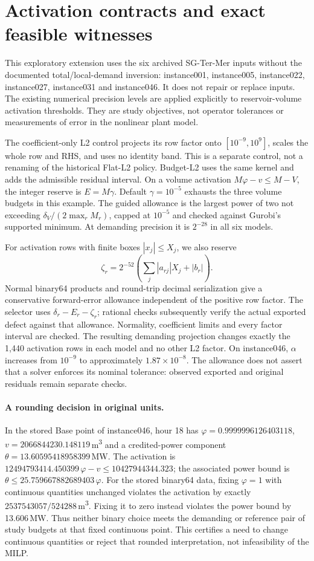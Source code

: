 \documentclass[11pt]{article}
\begin{document}
\section{Activation contracts and exact feasible witnesses}
\label{sec:activation-followup}
This exploratory extension uses the six archived SG-Ter-Mer inputs without the
documented total/local-demand inversion: instance001, instance005, instance022,
instance027, instance031 and instance046. It does not repair or replace inputs.
The existing numerical precision levels are applied explicitly to reservoir-volume
activation thresholds. They are study objectives, not operator tolerances or
measurements of error in the nonlinear plant model.

The coefficient-only L2 control projects its row factor onto $[10^{-9},10^9]$,
scales the whole row and RHS, and uses no identity band. This is a separate control,
not a renaming of the historical Flat-L2 policy. Budget-L2 uses the same kernel
and adds the admissible residual interval. On a volume activation
$M\varphi-v\le M-V$, the integer reserve is $E=M\gamma$. Default
$\gamma=10^{-5}$ exhausts the three volume budgets in this example. The guided
allowance is the largest power of two not exceeding
$\delta_V/(2\max_r M_r)$, capped at $10^{-5}$ and checked against Gurobi's
supported minimum. At demanding precision it is $2^{-28}$ in all six models.

For activation rows with finite boxes $|x_j|\le X_j$, we also reserve
\[
 \zeta_r=2^{-52}\left(\sum_j|a_{rj}|X_j+|b_r|\right).
\]
Normal binary64 products and round-trip decimal serialization give a conservative
forward-error allowance independent of the positive row factor. The selector
uses $\delta_r-E_r-\zeta_r$; rational checks subsequently verify the actual exported
defect against that allowance. Normality, coefficient limits and every factor
interval are checked. The resulting demanding projection changes exactly the
1,440 activation rows in each model and no other L2 factor. On instance046,
$\alpha$ increases from $10^{-9}$ to approximately $1.87\times10^{-8}$.
The allowance does not assert that a solver enforces its nominal tolerance:
observed exported and original residuals remain separate checks.

\paragraph{A rounding decision in original units.}
In the stored Base point of instance046, hour 18 has
$\varphi=0.9999996126403118$, $v=2066844230.148119$\,m\textsuperscript{3}
and a credited-power component $\theta=13.60595418958399$\,MW.
The activation is $12494793414.450399\,\varphi-v\le10427944344.323$;
the associated power bound is $\theta\le25.759667882689403\,\varphi$.
For the stored binary64 data, fixing $\varphi=1$ with continuous quantities
unchanged violates the activation by exactly $2537543057/524288$\,m\textsuperscript{3}.
Fixing it to zero instead violates the power bound by 13.606\,MW.
Thus neither binary choice meets the demanding or reference pair of study
budgets at that fixed continuous point. This certifies a need to change continuous
quantities or reject that rounded interpretation, not infeasibility of the MILP.
\end{document}
